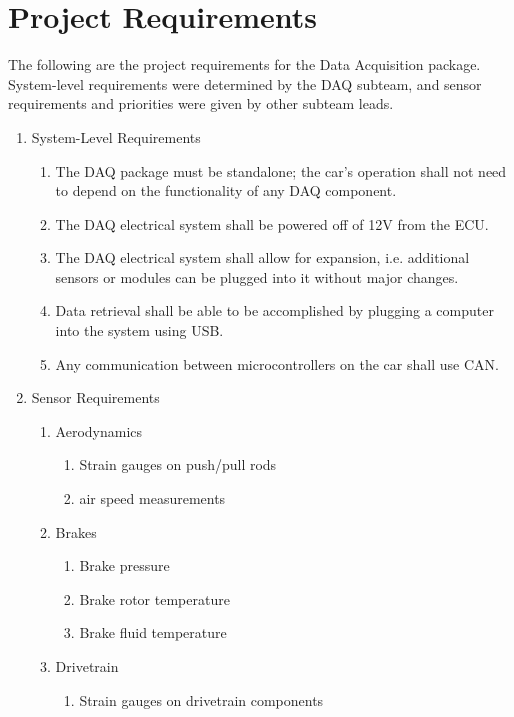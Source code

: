 \section{Project Requirements}
The following are the project requirements for the Data Acquisition package.
System-level requirements were determined by the DAQ subteam, and sensor requirements and priorities were given by other subteam leads.
\begin{enumerate}
    \item System-Level Requirements
    \begin{enumerate}
        \item The DAQ package must be standalone; the car's operation shall not need to depend on the functionality of any DAQ component.
        \item The DAQ electrical system shall be powered off of 12V from the ECU.
        \item The DAQ electrical system shall allow for expansion, i.e. additional sensors or modules can be plugged into it without major changes.
        \item Data retrieval shall be able to be accomplished by plugging a computer into the system using USB.
        \item Any communication between microcontrollers on the car shall use CAN.
    \end{enumerate}
    \item Sensor Requirements
    \begin{enumerate}
        \item Aerodynamics
        \begin{enumerate}
            \item Strain gauges on push/pull rods
            \item air speed measurements
        \end{enumerate}
        \item Brakes
        \begin{enumerate}
            \item Brake pressure
            \item Brake rotor temperature
            \item Brake fluid temperature
        \end{enumerate}
        \item Drivetrain
        \begin{enumerate}
            \item Strain gauges on drivetrain components
        \end{enumerate}

\end{enumerate}
\end{enumerate}
